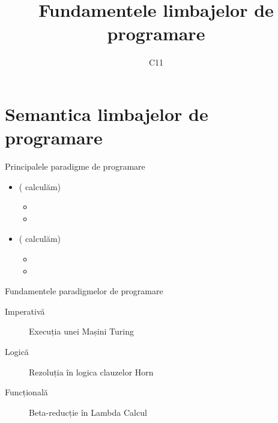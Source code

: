 \documentclass[xcolor=pdftex,romanian,colorlinks]{beamer}
\title[FLP]{Fundamentele limbajelor de programare}
\subtitle{C11}
\date{}
\begin{document}
\begin{frame}
  \titlepage
\end{frame}

\setlength{\leftmargini}{12pt}





\section{\color{section-color}Semantica limbajelor de programare} 

\begin{frame}{Principalele paradigme de programare}
\begin{itemize}
	\item {} ( calculăm)
	\vspace{.2cm}
	\begin{itemize}
	\item {}
		\vspace{.2cm}
	\item {}
	
	\end{itemize}
	
	\vspace{.2cm}
	\item  {} ( calculăm)
		\vspace{.2cm}
	\begin{itemize}
	
	\item {}
	\vspace{.2cm}
	\item {}

	\end{itemize}
\end{itemize}

 \vspace{.2cm}
	\begin{block}{Fundamentele paradigmelor de programare}
		\begin{description}
			\item[Imperativă] Execuția unei Mașini Turing
			\item[Logică] Rezoluția în logica clauzelor Horn
			\item[Funcțională] Beta-reducție în Lambda Calcul
		\end{description}
	\end{block}


\end{frame}
\end{document}
